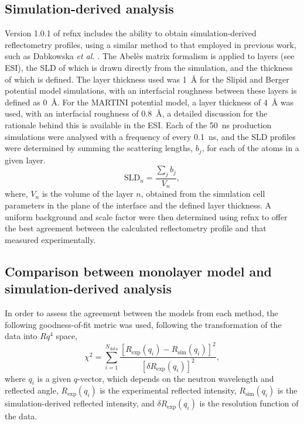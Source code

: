 \documentclass[amsmath,amssymb,twocolumn,superscriptaddress]{revtex4-1}
\begin{document}
\subsection{Simulation-derived analysis}
Version 1.0.1 of refnx \cite{Nelson2018,refnx} includes the ability to obtain simulation-derived reflectometry profiles, using a similar method to that employed in previous work, such as Dabkowska \emph{et al.} \cite{Dabkowska2014}.
The Abel\`{e}s matrix formalism is applied to layers (see ESI), the SLD of which is drawn directly from the simulation, and the thickness of which is defined.
The layer thickness used was \SI{1}{\angstrom} for the Slipid and Berger potential model simulations, with an interfacial roughness between these layers is defined as \SI{0}{\angstrom}.
For the MARTINI potential model, a layer thickness of \SI{4}{\angstrom} was used, with an interfacial roughness of \SI{0.8}{\angstrom}, a detailed discussion for the rationale behind this is available in the ESI.
Each of the \SI{50}{\nano\second} production simulations were analysed with a frequency of every \SI{0.1}{\nano\second}, and the SLD profiles were determined by summing the scattering lengths, $b_j$, for each of the atoms in a given layer.
%
\begin{equation}
  \text{SLD}_n = \frac{\sum_j{b_j}}{V_n},
\end{equation}
%
where, $V_n$ is the volume of the layer $n$, obtained from the simulation cell parameters in the plane of the interface and the defined layer thickness.
A uniform background and scale factor were then determined using refnx to offer the best agreement between the calculated reflectometry profile and that measured experimentally.

\subsection{Comparison between monolayer model and simulation-derived analysis}
\label{sec:para}
In order to assess the agreement between the models from each method, the following goodness-of-fit metric was used, following the transformation of the data into $Rq^4$ space,
%
\begin{equation}
  \chi^2 = \sum_{i=1}^{N_{\text{data}}} \frac{[R_{\text{exp}}(q_i) - R_{\text{sim}}(q_i)]^2}{[\delta R_{\text{exp}}(q_i)]^2},
\end{equation}
%
where $q_i$ is a given $q$-vector, which depends on the neutron wavelength and reflected angle, $R_{\text{exp}}(q_i)$ is the experimental reflected intensity, $R_{\text{sim}}(q_i)$ is the simulation-derived reflected intensity, and $\delta R_{\text{exp}}(q_i)$ is the resolution function of the data.
\end{document}
